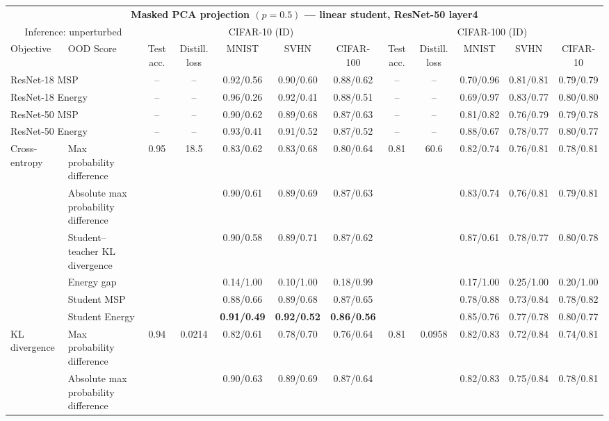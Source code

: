 \documentclass[border=2pt]{standalone}
\begin{document}
\scriptsize
\setlength{\tabcolsep}{4pt}
\begin{tabular}{llcccccccccc}
\multicolumn{12}{c}{\textbf{Masked PCA projection $(p=0.5)$ --- linear student, ResNet-50 layer4}}\\[4pt]
\multicolumn{2}{c}{Inference: unperturbed} & \multicolumn{5}{c}{CIFAR-10 (ID)} & \multicolumn{5}{c}{CIFAR-100 (ID)} \\
\cmidrule(lr){3-7} \cmidrule(lr){8-12}
\toprule
Objective & OOD Score & Test acc. & Distill. loss & MNIST & SVHN & CIFAR-100 & Test acc. & Distill. loss & MNIST & SVHN & CIFAR-10 \\
\midrule
\multicolumn{2}{l}{ResNet-18 MSP} & -- & -- & 0.92/0.56 & 0.90/0.60 & 0.88/0.62 & -- & -- & 0.70/0.96 & 0.81/0.81 & 0.79/0.79 \\
\multicolumn{2}{l}{ResNet-18 Energy} & -- & -- & 0.96/0.26 & 0.92/0.41 & 0.88/0.51 & -- & -- & 0.69/0.97 & 0.83/0.77 & 0.80/0.80 \\
\multicolumn{2}{l}{ResNet-50 MSP} & -- & -- & 0.90/0.62 & 0.89/0.68 & 0.87/0.63 & -- & -- & 0.81/0.82 & 0.76/0.79 & 0.79/0.78 \\
\multicolumn{2}{l}{ResNet-50 Energy} & -- & -- & 0.93/0.41 & 0.91/0.52 & 0.87/0.52 & -- & -- & 0.88/0.67 & 0.78/0.77 & 0.80/0.77 \\
\midrule
Cross-entropy & Max probability difference & 0.95 & 18.5 & 0.83/0.62 & 0.83/0.68 & 0.80/0.64 & 0.81 & 60.6 & 0.82/0.74 & 0.76/0.81 & 0.78/0.81 \\
 & Absolute max probability difference &  &  & 0.90/0.61 & 0.89/0.69 & 0.87/0.63 &  &  & 0.83/0.74 & 0.76/0.81 & 0.79/0.81 \\
 & Student--teacher KL divergence &  &  & 0.90/0.58 & 0.89/0.71 & 0.87/0.62 &  &  & 0.87/0.61 & 0.78/0.77 & 0.80/0.78 \\
 & Energy gap &  &  & 0.14/1.00 & 0.10/1.00 & 0.18/0.99 &  &  & 0.17/1.00 & 0.25/1.00 & 0.20/1.00 \\
 & Student MSP &  &  & 0.88/0.66 & 0.89/0.68 & 0.87/0.65 &  &  & 0.78/0.88 & 0.73/0.84 & 0.78/0.82 \\
 & Student Energy &  &  & \textbf{0.91/0.49} & \textbf{0.92/0.52} & \textbf{0.86/0.56} &  &  & 0.85/0.76 & 0.77/0.78 & 0.80/0.77 \\
\addlinespace
KL divergence & Max probability difference & 0.94 & 0.0214 & 0.82/0.61 & 0.78/0.70 & 0.76/0.64 & 0.81 & 0.0958 & 0.82/0.83 & 0.72/0.84 & 0.74/0.81 \\
 & Absolute max probability difference &  &  & 0.90/0.63 & 0.89/0.69 & 0.87/0.64 &  &  & 0.82/0.83 & 0.75/0.84 & 0.78/0.81 \\

\end{tabular}
\end{document}
